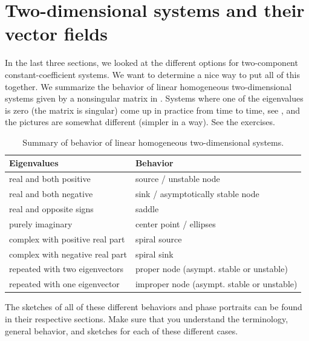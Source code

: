 \section{Two-dimensional systems and their vector fields}
\label{sec:twodimaut}




In the last three sections, we looked at the different options for two-component constant-coefficient systems. We want to determine a nice way to put all of this together. We summarize the behavior of linear homogeneous two-dimensional systems
given by a nonsingular matrix
in .
Systems where one of the eigenvalues is zero (the matrix is singular)
come up in practice from time to time, see
, and the pictures are somewhat
different (simpler in a way).  See the exercises.

\begin{table}[h!t]
\mybeginframe
\capstart
\begin{center}
\begin{tabular}{@{}ll@{}}
\toprule
Eigenvalues & Behavior \\
\midrule
real and both positive & source / unstable node \\
real and both negative & sink / asymptotically stable node \\
real and opposite signs & saddle \\
purely imaginary & center point / ellipses \\
complex with positive real part & spiral source \\
complex with negative real part & spiral sink \\
repeated with two eigenvectors & proper node  (asympt. stable or unstable) \\
repeated with one eigenvector & improper node (asympt. stable or unstable) \\
\bottomrule
\end{tabular}
\end{center}
\caption{Summary of behavior of linear homogeneous two-dimensional systems.\label{pln:behtab}}
\myendframe
\end{table}

The sketches of all of these different behaviors and phase portraits can be found in their respective sections. Make sure that you understand the terminology, general behavior, and sketches for each of these different cases. 

